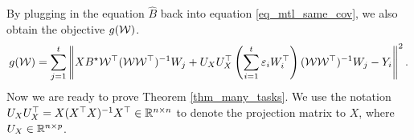 	By plugging in the equation $\hat{B}$ back into equation \eqref{eq_mtl_same_cov}, we also obtain the objective $g({\mathcal W})$.
	\begin{align}
		g(\mathcal W) = \sum_{j=1}^t \left\| X B^{\star} {\mathcal W}^{\top} ({\mathcal W}{\mathcal W}^{\top})^{-1} W_j + U_X U_X^{\top} \left({\sum_{i=1}^t \varepsilon_i W_i^{\top}}\right) ({\mathcal W}{\mathcal W}^{\top})^{-1} W_j - Y_i \right\|^2. \label{eq_mtl_output_layer}
	\end{align}
	Now we are ready to prove Theorem \ref{thm_many_tasks}.
	We use the notation $U_X U_X^{\top} = X (X^{\top} X)^{-1} X^{\top} \in\mathbb{R}^{n \times n}$ to denote the projection matrix to $X$, where $U_X\in\mathbb{R}^{n \times p}$.





